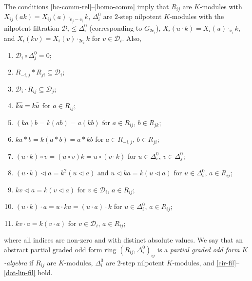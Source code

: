\documentclass{article}
\theoremstyle{definition}
\newcommand{\inv}[1]{
    \!\;\overline{
        \!\!\:#1\vphantom !\!\!\:
    }\;\!
}
\begin{document}
The conditions \ref{bc-comm-rel}--\ref{homo-comm} imply that \(R_{ij}\) are \(K\)-modules with \(
    X_{ij}(ak)
    =
    X_{ij}(a) \cdot_{\mathrm e_j - \mathrm e_i} k
\), \(\Delta^0_i\) are \(2\)-step nilpotent \(K\)-modules with the nilpotent filtration \(
    \mathcal D_i \leq \Delta^0_i
\) (corresponding to \(G_{2 \mathrm e_i}\)), \(
    X_i(u \cdot k) = X_i(u) \cdot_{\mathrm e_i} k
\), and \(
    X_i(kv) = X_i(v) \cdot_{2 \mathrm e_i} k
\) for \(v \in \mathcal D_i\). Also,
\begin{enumerate}[label = {(R\arabic*)}, start = 31]

    \item \label{cir-fil} \(
        \mathcal D_i \circ \Delta^0_j = 0
    \);

    \item \label{fil-str} \(
        R_{-i, j} * R_{ji} \subseteq \mathcal D_i
    \);

    \item \label{dot-fil} \(
        \mathcal D_i \cdot R_{ij}
        \subseteq
        \mathcal D_j
    \);

    \item \label{inv-lin} \(
        \inv{ka} = k \inv a
    \) for \(a \in R_{ij}\);

    \item \label{mul-lin} \(
        (ka) b = k(ab) = a(kb)
    \) for \(a \in R_{ij}\), \(b \in R_{jk}\);

    \item \label{str-lin} \(
        ka * b = k(a * b) = a * kb
    \) for \(a \in R_{-i, j}\), \(b \in R_{ji}\);

    \item \label{cir-lin} \(
        (u \cdot k) \circ v
        =
        (u \circ v) k
        =
        u \circ (v \cdot k)
    \) for \(u \in \Delta^0_i\), \(v \in \Delta^0_j\);

    \item \label{tri-lin} \(
        (u \cdot k) \triangleleft a
        =
        k^2 (u \triangleleft a)
    \) and \(
        u \triangleleft ka = k(u \triangleleft a)
    \) for \(u \in \Delta^0_i\), \(a \in R_{ij}\);

    \item \label{tri-lin-fil} \(
        kv \triangleleft a = k(v \triangleleft a)
    \) for \(v \in \mathcal D_i\), \(a \in R_{ij}\);

    \item \label{dot-lin} \(
        (u \cdot k) \cdot a
        =
        u \cdot ka
        =
        (u \cdot a) \cdot k
    \) for \(u \in \Delta^0_i\), \(a \in R_{ij}\);

    \item \label{dot-lin-fil} \(
        kv \cdot a = k(v \cdot a)
    \) for \(v \in \mathcal D_i\), \(a \in R_{ij}\);

\end{enumerate}
where all indices are non-zero and with distinct absolute values. We say that an abstract partial graded odd form ring \(
    (R_{ij}, \Delta^0_i)_{ij}
\) is a \textit{partial graded odd form \(K\)-algebra} if \(R_{ij}\) are \(K\)-modules, \(\Delta^0_i\) are \(2\)-step nilpotent \(K\)-modules, and \ref{cir-fil}--\ref{dot-lin-fil} hold.
\end{document}
